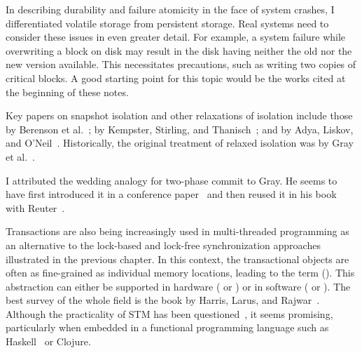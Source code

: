 In describing durability and failure atomicity in the face of system
crashes, I differentiated volatile storage from persistent storage.
Real systems need to consider these issues in even greater detail.
For example, a system failure while overwriting a block on disk may
result in the disk having neither the old nor the new version
available.  This necessitates precautions, such as
writing two copies of critical blocks.  A good starting point
for this topic would be the works cited at the beginning of these
notes.

Key papers on snapshot isolation and other relaxations of isolation
include those by Berenson et
al.~\cite{max1022}; by Kempster,
Stirling, and Thanisch~\cite{max1023}; and by Adya,
Liskov, and
O'Neil~\cite{max1021}. Historically, the
original treatment of relaxed isolation was by Gray
et al.~\cite{max1059}.

I attributed the wedding analogy for two-phase commit to Gray.  He seems to have first introduced it in a conference
paper~\cite{max1051} and then reused it in his book with
Reuter~\cite{max1009}.

Transactions are also being increasingly used in multi-threaded
programming as an alternative to the lock-based and lock-free
synchronization approaches illustrated in the previous chapter.  In
this context, the transactional objects are often as fine-grained as
individual memory locations, leading to the term  ().
This abstraction can either be supported in hardware ( or )
or in software ( or ). The best survey of
the whole field is the book by Harris, Larus, and Rajwar~\cite{max1204}.
Although the practicality of STM has been questioned~\cite{max1206,max1207}, it seems promising, particularly when
embedded in a functional programming language such as Haskell~\cite{max1205} or Clojure.
